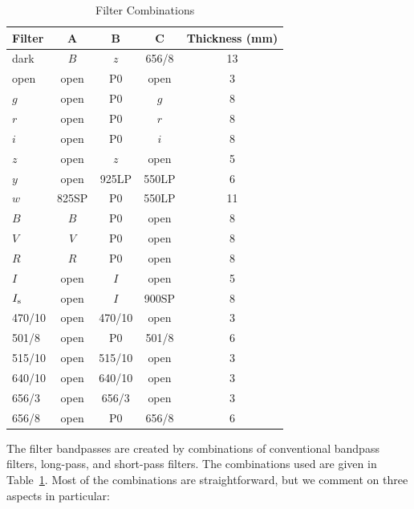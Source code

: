 \begin{table}
\begin{center}
\caption{Filter Combinations}
\label{table:huitzi-f20-filter-combinations}
\medskip
\begin{tabular}{lcccc}
\hline
Filter&A&B&C&Thickness (mm)\\
\hline
dark		&$B$		&$z$		&656/8	&\phantom{}13		\\
open		&open		&P0		&open		&\phantom{0}3		\\
$g$		&open		&P0		&$g$		&\phantom{0}8		\\
$r$		&open		&P0		&$r$		&\phantom{0}8		\\
$i$			&open		&P0		&$i$		&\phantom{0}8		\\
$z$		&open		&$z$		&open		&\phantom{0}5		\\
$y$		&open		&925LP	&550LP	&\phantom{0}6		\\
$w$		&825SP	&P0		&550LP	&\phantom{}11		\\
$B$		&$B$		&P0		&open		&\phantom{0}8		\\
$V$		&$V$		&P0		&open		&\phantom{0}8		\\
$R$		&$R$		&P0		&open		&\phantom{0}8		\\
$I$		&open		&$I$		&open		&\phantom{0}5		\\
$\mbox{$I_\mathrm{s}$}$		&open		&$I$		&900SP	&\phantom{0}8		\\
470/10	&open		&470/10	&open		&\phantom{0}3		\\
501/8		&open		&P0		&501/8	&\phantom{0}6		\\
515/10	&open		&515/10	&open		&\phantom{0}3		\\
640/10	&open		&640/10	&open		&\phantom{0}3		\\
656/3		&open		&656/3	&open		&\phantom{0}3		\\
656/8		&open		&P0		&656/8	&\phantom{0}6		\\
\hline
\end{tabular}
\end{center}
\end{table}

The filter bandpasses are created by combinations of conventional bandpass filters, long-pass, and short-pass filters. The combinations used are given in Table~\ref{table:huitzi-f20-filter-combinations}. Most of the combinations are straightforward, but we comment on three aspects in particular:

